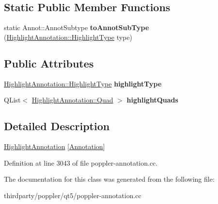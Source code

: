 \subsection*{Static Public Member Functions}
\begin{DoxyCompactItemize}
\item 
\mbox{\label{class_poppler_1_1_highlight_annotation_private_a494b9727c66c475fc14ba67d9b76bdb7}} 
static Annot\+::\+Annot\+Subtype {\bfseries to\+Annot\+Sub\+Type} (\hyperlink{class_poppler_1_1_highlight_annotation_ae605e74038eb2a3810a789377524f2a0}{Highlight\+Annotation\+::\+Highlight\+Type} type)
\end{DoxyCompactItemize}
\subsection*{Public Attributes}
\begin{DoxyCompactItemize}
\item 
\mbox{\label{class_poppler_1_1_highlight_annotation_private_a1d753c60bb37450d447c3b8cca2d157b}} 
\hyperlink{class_poppler_1_1_highlight_annotation_ae605e74038eb2a3810a789377524f2a0}{Highlight\+Annotation\+::\+Highlight\+Type} {\bfseries highlight\+Type}
\item 
\mbox{\label{class_poppler_1_1_highlight_annotation_private_afebb1d7a20b8dd878e5bff6d22bb458d}} 
Q\+List$<$ \hyperlink{struct_poppler_1_1_highlight_annotation_1_1_quad}{Highlight\+Annotation\+::\+Quad} $>$ {\bfseries highlight\+Quads}
\end{DoxyCompactItemize}


\subsection{Detailed Description}
\hyperlink{class_poppler_1_1_highlight_annotation}{Highlight\+Annotation} \mbox{[}\hyperlink{class_poppler_1_1_annotation}{Annotation}\mbox{]} 

Definition at line 3043 of file poppler-\/annotation.\+cc.



The documentation for this class was generated from the following file\+:\begin{DoxyCompactItemize}
\item 
thirdparty/poppler/qt5/poppler-\/annotation.\+cc\end{DoxyCompactItemize}

